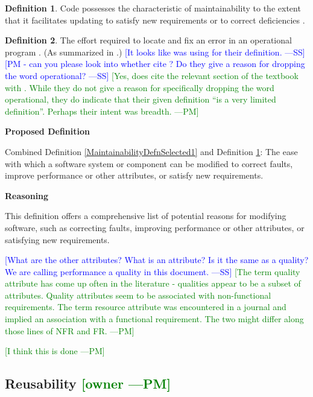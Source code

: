 \documentclass[letterpaper,cleveref]{lipics-v2019}
\newcommand{\authornote}[3]{\textcolor{#1}{[#3 ---#2]}}
\newcommand{\authornote}[3]{}
\newcommand{\wss}[1]{\authornote{blue}{SS}{#1}} %
\newcommand{\pmi}[1]{\authornote{green}{PM}{#1}} %
\theoremstyle{definition}
\newtheorem{defn}{Definition}
\begin{document}
\begin{defn} \label{MaintainabilityDefnSelected2} 
  Code possesses the characteristic of maintainability to the extent that it
  facilitates updating to satisfy new requirements or to correct deficiencies
  \citep{boehm2007software}.
\end{defn}

\begin{defn}
  The effort required to locate and fix an error in an operational program
  \citep{McCallEtAl1977}. (As summarized in \citet{VanVliet2000}.) \wss{It looks
    like \citet{pressman2005software} was using \citet{McCallEtAl1977} for their
    definition.} \wss{PM - can you please look into whether
    \citet{pressman2005software} cite \citet{McCallEtAl1977}?  Do they give a
    reason for dropping the word operational?}  \pmi{Yes,
    \citet{pressman2005software} does cite the relevant section of the textbook
    with \citet{McCallEtAl1977}. While they do not give a reason for
    specifically dropping the word operational, they do indicate that their
    given definition ``is a very limited definition''. Perhaps their intent was
    breadth.}
\end{defn}

\noindent \textbf{Proposed Definition}

Combined Definition \ref{MaintainabilityDefnSelected1} and Definition
\ref{MaintainabilityDefnSelected2}: The ease with which a software system or
component can be modified to correct faults, improve performance or other
attributes, or satisfy new requirements.

\noindent \textbf{Reasoning}

This definition offers a comprehensive list of potential reasons for modifying
software, such as correcting faults, improving performance or other attributes,
or satisfying new requirements.

\wss{What are the other attributes?  What is an attribute?  Is it the
	same as a quality?  We are calling performance a quality in this document.}
\pmi{The term quality attribute has come up often in the literature - qualities
	appear to be a subset of attributes. Quality attributes seem to be associated
	with non-functional requirements. The term resource attribute was encountered in
	a journal and implied an association with a functional requirement. The two
	might differ along those lines of NFR and FR.}

\pmi{I think this is done}

\subsection{{Reusability} \pmi{owner}}
\end{document}
